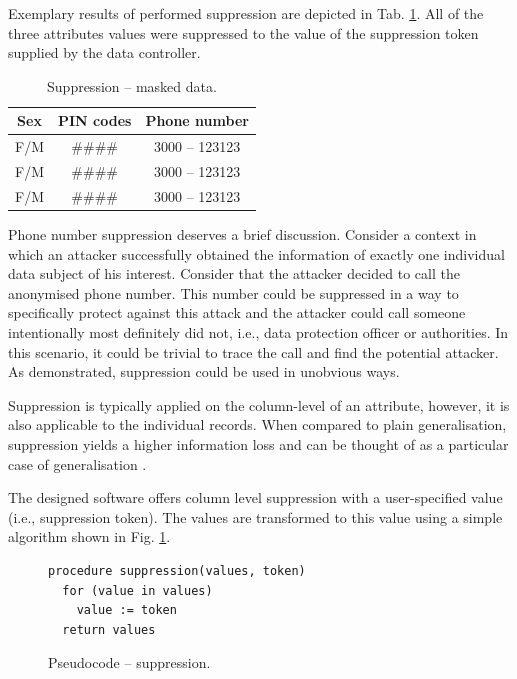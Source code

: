 \documentclass[a4paper,twoside,12pt]{book}
\begin{document}
Exemplary results of performed suppression are depicted in Tab. \ref{id:tab:suppression}. All of the three attributes values were suppressed to the value of the suppression token supplied by the data controller.

\begin{table}%
\centering
\caption{Suppression  – masked data.}
\label{id:tab:suppression}
\begin{tabular}{ccc}
\toprule
Sex & PIN codes & Phone number \\ \midrule
F/M & \#\#\#\#  & 3000 – 123123  \\
F/M & \#\#\#\#  & 3000 – 123123  \\
F/M & \#\#\#\#  & 3000 – 123123 \\
\bottomrule
\end{tabular}
\end{table}

Phone number suppression deserves a brief discussion. Consider a context in which an attacker successfully obtained the information of exactly one individual data subject of his interest. Consider that the attacker decided to call the anonymised phone number. This number could be suppressed in a way to specifically protect against this attack and the attacker could call someone intentionally most definitely did not, i.e., data protection officer or authorities. In this scenario, it could be trivial to trace the call and find the potential attacker. As demonstrated, suppression could be used in unobvious ways.

Suppression is typically applied on the column-level of an attribute, however, it is also applicable to the individual records. When compared to plain generalisation, suppression yields a higher information loss and can be thought of as a particular case of generalisation \cite{bib:anonymization_emr}. 

The designed software offers column level suppression with a user-specified value (i.e., suppression token). The values are transformed to this value using a simple algorithm shown in Fig. \ref{fig:code:suppression}.

\begin{figure}[H]
\begin{verbatim}
procedure suppression(values, token)
  for (value in values)
    value := token
  return values
\end{verbatim}
\caption{Pseudocode – suppression.}
\label{fig:code:suppression}
\end{figure}
\end{document}
